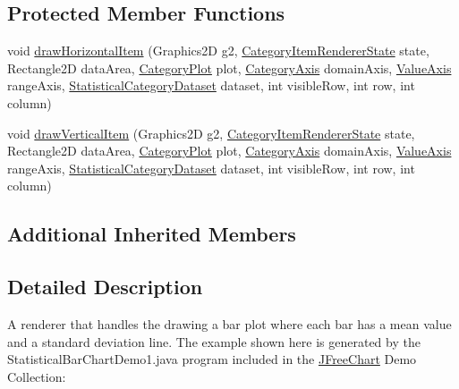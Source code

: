 \subsection*{Protected Member Functions}
\begin{DoxyCompactItemize}
\item 
void \mbox{\hyperlink{classorg_1_1jfree_1_1chart_1_1renderer_1_1category_1_1_statistical_bar_renderer_ad73392348b18bf012b508af9959ba164}{draw\+Horizontal\+Item}} (Graphics2D g2, \mbox{\hyperlink{classorg_1_1jfree_1_1chart_1_1renderer_1_1category_1_1_category_item_renderer_state}{Category\+Item\+Renderer\+State}} state, Rectangle2D data\+Area, \mbox{\hyperlink{classorg_1_1jfree_1_1chart_1_1plot_1_1_category_plot}{Category\+Plot}} plot, \mbox{\hyperlink{classorg_1_1jfree_1_1chart_1_1axis_1_1_category_axis}{Category\+Axis}} domain\+Axis, \mbox{\hyperlink{classorg_1_1jfree_1_1chart_1_1axis_1_1_value_axis}{Value\+Axis}} range\+Axis, \mbox{\hyperlink{interfaceorg_1_1jfree_1_1data_1_1statistics_1_1_statistical_category_dataset}{Statistical\+Category\+Dataset}} dataset, int visible\+Row, int row, int column)
\item 
void \mbox{\hyperlink{classorg_1_1jfree_1_1chart_1_1renderer_1_1category_1_1_statistical_bar_renderer_a47ca5c6eeb24c7381ddf96a69b0fb575}{draw\+Vertical\+Item}} (Graphics2D g2, \mbox{\hyperlink{classorg_1_1jfree_1_1chart_1_1renderer_1_1category_1_1_category_item_renderer_state}{Category\+Item\+Renderer\+State}} state, Rectangle2D data\+Area, \mbox{\hyperlink{classorg_1_1jfree_1_1chart_1_1plot_1_1_category_plot}{Category\+Plot}} plot, \mbox{\hyperlink{classorg_1_1jfree_1_1chart_1_1axis_1_1_category_axis}{Category\+Axis}} domain\+Axis, \mbox{\hyperlink{classorg_1_1jfree_1_1chart_1_1axis_1_1_value_axis}{Value\+Axis}} range\+Axis, \mbox{\hyperlink{interfaceorg_1_1jfree_1_1data_1_1statistics_1_1_statistical_category_dataset}{Statistical\+Category\+Dataset}} dataset, int visible\+Row, int row, int column)
\end{DoxyCompactItemize}
\subsection*{Additional Inherited Members}


\subsection{Detailed Description}
A renderer that handles the drawing a bar plot where each bar has a mean value and a standard deviation line. The example shown here is generated by the {\ttfamily Statistical\+Bar\+Chart\+Demo1.\+java} program included in the \mbox{\hyperlink{classorg_1_1jfree_1_1chart_1_1_j_free_chart}{J\+Free\+Chart}} Demo Collection\+: ~\newline
~\newline
  

